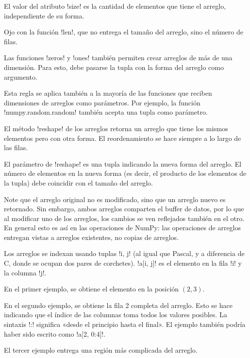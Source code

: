 \documentclass[10pt]{article}
\begin{document}
  El valor del atributo \li!size! es la cantidad de elementos
  que tiene el arreglo, independiente de su forma.

  Ojo con la función \li!len!, que no entrega el tamaño del arreglo,
  sino el número de filas.


  Las funciones \li!zeros! y \li!ones!
  también permiten crear arreglos de más de una dimensión.
  Para esto, debe pasarse la tupla con la forma del arreglo
  como argumento.

  Esta regla se aplica también a la mayoría de las funciones
  que reciben dimensiones de arreglos como parámetros.
  Por ejemplo,
  la función \li!numpy.random.random! también acepta
  una tupla como parámetro.


  El método \li!reshape! de los arreglos
  retorna un arreglo que tiene los mismos elementos
  pero con otra forma.
  El reordenamiento se hace siempre a lo largo de las filas.

  El parámetro de \li!reshape! es una tupla
  indicando la nueva forma del arreglo.
  El número de elementos en la nueva forma
  (es decir, el producto de los elementos de la tupla)
  debe coincidir con el tamaño del arreglo.

  Note que el arreglo original no es modificado,
  sino que un arreglo nuevo es retornado.
  Sin embargo, ambos arreglos comparten el buffer de datos,
  por lo que al modificar uno de los arreglos,
  los cambios se ven reflejados también en el otro.
  En general esto es así en las operaciones de NumPy:
  las operaciones de arreglos entregan vistas
  a arreglos existentes, no copias de arreglos.


  Los arreglos se indexan usando tuplas \li!i, j!
  (al igual que Pascal,
  y a diferencia de C, donde se ocupan dos pares de corchetes).
  \li!a[i, j]! es el elemento en la fila \li!i! y la columna \li!j!.

  En el primer ejemplo,
  se obtiene el elemento en la posición \((2, 3)\).

  En el segundo ejemplo,
  se obtiene la fila 2 completa del arreglo.
  Esto se hace indicando que el índice de las columnas
  toma todos los valores posibles.
  La sintaxis \li!:! significa «desde el principio hasta el final».
  El ejemplo también podría haber sido escrito como \li!a[2, 0:4]!.

  El tercer ejemplo entrega una región más complicada del arreglo.
\end{document}
